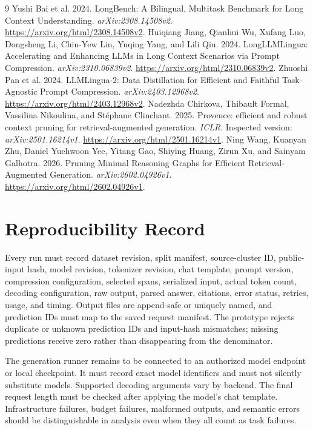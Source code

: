 \documentclass[10pt,twocolumn]{article}
\begin{document}
\begin{thebibliography}{9}
 Yushi Bai et al. 2024. LongBench: A Bilingual, Multitask Benchmark for Long Context Understanding. \emph{arXiv:2308.14508v2}. \url{https://arxiv.org/html/2308.14508v2}.
 Huiqiang Jiang, Qianhui Wu, Xufang Luo, Dongsheng Li, Chin-Yew Lin, Yuqing Yang, and Lili Qiu. 2024. LongLLMLingua: Accelerating and Enhancing LLMs in Long Context Scenarios via Prompt Compression. \emph{arXiv:2310.06839v2}. \url{https://arxiv.org/html/2310.06839v2}.
 Zhuoshi Pan et al. 2024. LLMLingua-2: Data Distillation for Efficient and Faithful Task-Agnostic Prompt Compression. \emph{arXiv:2403.12968v2}. \url{https://arxiv.org/html/2403.12968v2}.
 Nadezhda Chirkova, Thibault Formal, Vassilina Nikoulina, and St\'ephane Clinchant. 2025. Provence: efficient and robust context pruning for retrieval-augmented generation. \emph{ICLR}. Inspected version: \emph{arXiv:2501.16214v1}. \url{https://arxiv.org/html/2501.16214v1}.
 Ning Wang, Kuanyan Zhu, Daniel Yuehwoon Yee, Yitang Gao, Shiying Huang, Zirun Xu, and Sainyam Galhotra. 2026. Pruning Minimal Reasoning Graphs for Efficient Retrieval-Augmented Generation. \emph{arXiv:2602.04926v1}. \url{https://arxiv.org/html/2602.04926v1}.
\end{thebibliography}

\appendix
\section{Reproducibility Record}
Every run must record dataset revision, split manifest, source-cluster ID, public-input hash, model revision, tokenizer revision, chat template, prompt version, compression configuration, selected spans, serialized input, actual token count, decoding configuration, raw output, parsed answer, citations, error status, retries, usage, and timing. Output files are append-safe or uniquely named, and prediction IDs must map to the saved request manifest. The prototype rejects duplicate or unknown prediction IDs and input-hash mismatches; missing predictions receive zero rather than disappearing from the denominator.

The generation runner remains to be connected to an authorized model endpoint or local checkpoint. It must record exact model identifiers and must not silently substitute models. Supported decoding arguments vary by backend. The final request length must be checked after applying the model's chat template. Infrastructure failures, budget failures, malformed outputs, and semantic errors should be distinguishable in analysis even when they all count as task failures.
\end{document}
